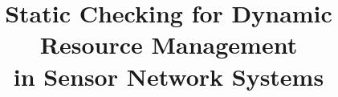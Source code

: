 \documentclass[10pt]{sigplanconf}
\begin{document}
\title{Static Checking for Dynamic Resource Management \\ in Sensor
  Network Systems}




\maketitle









{\small 



}
\end{document}
